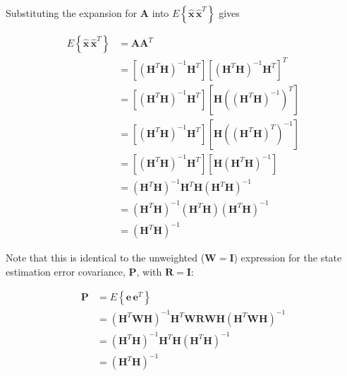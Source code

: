 \documentclass[12pt]{article}
\begin{document}
Substituting the expansion for $\mathbf{A}$ into
$E \left\{ \hat{\mathbf{x}} \, \hat{\mathbf{x}}^T \right\}$ gives

\begin{equation*}
    \begin{aligned}
        E \left\{ \hat{\mathbf{x}} \, \hat{\mathbf{x}}^T \right\} &= \mathbf{A} \mathbf{A}^T \\
        &= \left[ \left( \mathbf{H}^T \mathbf{H} \right)^{-1} \mathbf{H}^T \right] \left[ \left( \mathbf{H}^T \mathbf{H} \right)^{-1} \mathbf{H}^T \right]^T \\
        &= \left[ \left( \mathbf{H}^T \mathbf{H} \right)^{-1} \mathbf{H}^T \right] \left[ \mathbf{H} \left( \left( \mathbf{H}^T \mathbf{H} \right)^{-1} \right)^T \right] \\
        &= \left[ \left( \mathbf{H}^T \mathbf{H} \right)^{-1} \mathbf{H}^T \right] \left[ \mathbf{H} \left( \left( \mathbf{H}^T \mathbf{H} \right)^T \right)^{-1} \right] \\
        &= \left[ \left( \mathbf{H}^T \mathbf{H} \right)^{-1} \mathbf{H}^T \right] \left[ \mathbf{H} \left( \mathbf{H}^T \mathbf{H} \right)^{-1} \right] \\
        &= \left( \mathbf{H}^T \mathbf{H} \right)^{-1} \mathbf{H}^T \mathbf{H} \left( \mathbf{H}^T \mathbf{H} \right)^{-1} \\
        &= \left( \mathbf{H}^T \mathbf{H} \right)^{-1} \left( \mathbf{H}^T \mathbf{H} \right) \left( \mathbf{H}^T \mathbf{H} \right)^{-1} \\
        &= \left( \mathbf{H}^T \mathbf{H} \right)^{-1}
    \end{aligned}
\end{equation*}

Note that this is identical to the unweighted ($\mathbf{W} = \mathbf{I}$) expression for
the state estimation error covariance, $\mathbf{P}$, with $\mathbf{R} = \mathbf{I}$:

\begin{equation*}
    \begin{aligned}
        \mathbf{P} &= E \left\{ \mathbf{e} \, \mathbf{e}^T \right\} \\
        &= \left( \mathbf{H}^T \mathbf{W} \mathbf{H} \right)^{-1} \mathbf{H}^T \mathbf{W}
           \mathbf{R}
           \mathbf{W} \mathbf{H} \left( \mathbf{H}^T \mathbf{W} \mathbf{H} \right)^{-1} \\
        &= \left( \mathbf{H}^T \mathbf{H} \right)^{-1} \mathbf{H}^T \mathbf{H} \left( \mathbf{H}^T \mathbf{H} \right)^{-1} \\
        &= \left( \mathbf{H}^T \mathbf{H} \right)^{-1}
    \end{aligned}
\end{equation*}
\end{document}
